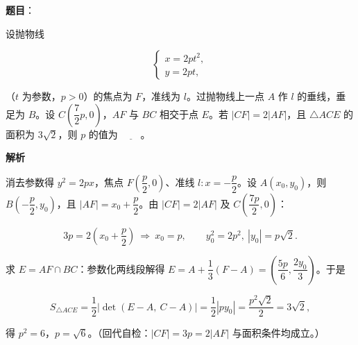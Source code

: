 \begin{answer}

\textbf{题目}：

设抛物线

\nopagebreak[4]
\[
\begin{cases}
x=2pt^{2},\\
y=2pt,
\end{cases}
\]

（\(t\) 为参数，\(p>0\)）的焦点为 \(F\)，准线为 \(l\)。过抛物线上一点 \(A\) 作 \(l\) 的垂线，垂足为 \(B\)。设 \(C\left(\dfrac{7}{2}p,0\right)\)，\(AF\) 与 \(BC\) 相交于点 \(E\)。若 \(|CF|=2|AF|\)，且 \(\triangle ACE\) 的面积为 \(3\sqrt{2}\)，则 \(p\) 的值为 \(\underline{\qquad}\)。

\textbf{解析}

消去参数得 \(y^{2}=2px\)，焦点 \(F\left(\dfrac{p}{2},0\right)\)、准线 \(l:x=-\dfrac{p}{2}\)。设 \(A(x_{0},y_{0})\)，则 \(B\left(-\dfrac{p}{2},y_{0}\right)\)，且 \(|AF|=x_{0}+\dfrac{p}{2}\)。由 \(|CF|=2|AF|\) 及 \(C\left(\dfrac{7p}{2},0\right)\)：

\nopagebreak[4]
\[
3p=2\left(x_{0}+\frac{p}{2}\right)\ \Longrightarrow\ x_{0}=p,\qquad y_{0}^{2}=2p^{2},\ |y_{0}|=p\sqrt{2}.
\]

求 \(E=AF\cap BC\)：参数化两线段解得 \(E=A+\dfrac{1}{3}(F-A)=\left(\dfrac{5p}{6},\dfrac{2y_{0}}{3}\right)\)。于是

\nopagebreak[4]
\[
S_{\triangle ACE}=\frac{1}{2}\left|\det(E-A,\ C-A)\right|=\frac{1}{2}\left|py_{0}\right|=\frac{p^{2}\sqrt{2}}{2}=3\sqrt{2},
\]

得 \(p^{2}=6\)，\(p=\sqrt{6}\)。（回代自检：\(|CF|=3p=2|AF|\) 与面积条件均成立。）


\end{answer}
